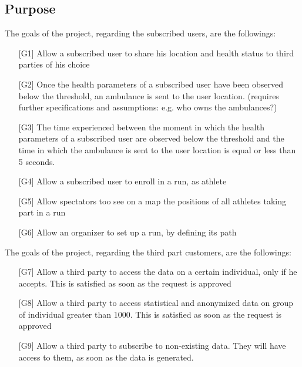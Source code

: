 \subsection{Purpose}

The goals of the project, regarding the subscribed users, are the followings:
\begin{enumerate}
\item[{[G1]}] Allow a subscribed user to share his location and health status to third parties of his choice
\item[{[G2]}]Once the health parameters of a subscribed user have been observed 
below the threshold, an ambulance is sent to the user location. (requires further specifications and assumptions: e.g. who owns the ambulances?)
\item[{[G3]}] The time experienced between the moment in which the health parameters of a subscribed user are observed below the threshold and the time in which the ambulance is sent to the user location is equal or less than 5 seconds. 
\item[{[G4]}] Allow a subscribed user to enroll in a run, as athlete
\item[{[G5]}] Allow spectators too see on a map the positions of all athletes taking part in a run
\item[{[G6]}] Allow an organizer to set up a run, by defining its path
\end{enumerate}

The goals of the project, regarding the third part customers, are the followings:
\begin{enumerate}
\item[{[G7]}] Allow a third party to access the data on a certain individual, only if he accepts. This is satisfied as soon as the request is approved
\item[{[G8]}] Allow a third party to access statistical and anonymized data on group of individual greater than 1000. This is satisfied as soon as the request is approved
\item[{[G9]}] Allow a third party to subscribe to non-existing data. They will have access to them, as soon as the data is generated. 
\end{enumerate}
